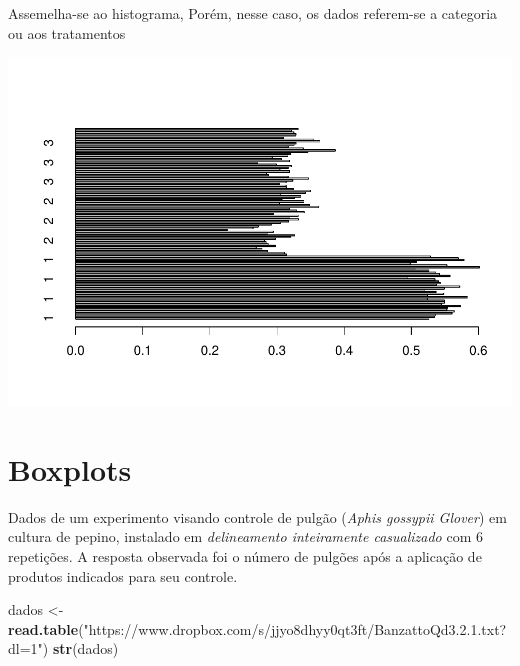\documentclass[
]{book}
\newenvironment{Shaded}{\begin{snugshade}}{\end{snugshade}}
\newcommand{\DataTypeTok}[1]{\textcolor[rgb]{0.13,0.29,0.53}{#1}}
\newcommand{\KeywordTok}[1]{\textcolor[rgb]{0.13,0.29,0.53}{\textbf{#1}}}
\newcommand{\NormalTok}[1]{#1}
\newcommand{\OperatorTok}[1]{\textcolor[rgb]{0.81,0.36,0.00}{\textbf{#1}}}
\newcommand{\StringTok}[1]{\textcolor[rgb]{0.31,0.60,0.02}{#1}}
\begin{document}
Assemelha-se ao histograma, Porém, nesse caso, os dados referem-se a categoria ou aos tratamentos

\begin{Shaded}
\end{Shaded}

\includegraphics{TudodoR_files/figure-latex/unnamed-chunk-169-1.pdf}

\hypertarget{boxplots}{%
\section{Boxplots}\label{boxplots}}

Dados de um experimento visando controle de pulgão (\emph{Aphis gossypii Glover}) em cultura de pepino, instalado em \emph{delineamento inteiramente casualizado} com 6 repetições. A resposta observada foi o número de pulgões após a aplicação de produtos indicados para seu controle.

\begin{Shaded}
\begin{Highlighting}[]
\NormalTok{dados <-}\StringTok{ }\KeywordTok{read.table}\NormalTok{(}\StringTok{"https://www.dropbox.com/s/jjyo8dhyy0qt3ft/BanzattoQd3.2.1.txt?dl=1"}\NormalTok{)}
\KeywordTok{str}\NormalTok{(dados)}
\end{Highlighting}
\end{Shaded}
\end{document}
